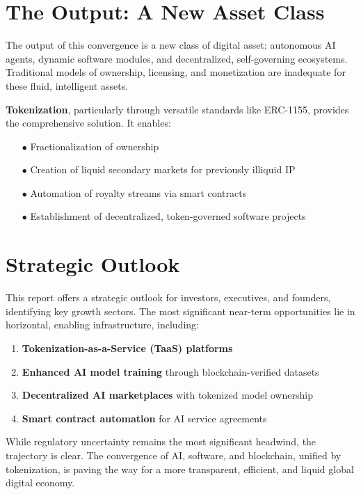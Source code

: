 \documentclass[11pt,a4paper]{report}
\newcommand{\techterm}[1]{\textbf{\textcolor{ocean}{#1}}}
\begin{document}
\section*{The Output: A New Asset Class}
The output of this convergence is a new class of digital asset: autonomous AI agents, dynamic software modules, and decentralized, self-governing ecosystems. Traditional models of ownership, licensing, and monetization are inadequate for these fluid, intelligent assets. 

\techterm{Tokenization}, particularly through versatile standards like ERC-1155, provides the comprehensive solution. It enables:

\begin{itemize}[leftmargin=2cm]
    \item[$\bullet$] Fractionalization of ownership
    \item[$\bullet$] Creation of liquid secondary markets for previously illiquid IP
    \item[$\bullet$] Automation of royalty streams via smart contracts
    \item[$\bullet$] Establishment of decentralized, token-governed software projects
\end{itemize}

\section*{Strategic Outlook}

This report offers a strategic outlook for investors, executives, and founders, identifying key growth sectors. The most significant near-term opportunities lie in horizontal, enabling infrastructure, including:

\begin{enumerate}
    \item \textbf{Tokenization-as-a-Service (TaaS) platforms}
    \item \textbf{Enhanced AI model training} through blockchain-verified datasets
    \item \textbf{Decentralized AI marketplaces} with tokenized model ownership
    \item \textbf{Smart contract automation} for AI service agreements
\end{enumerate}

While regulatory uncertainty remains the most significant headwind, the trajectory is clear. The convergence of AI, software, and blockchain, unified by tokenization, is paving the way for a more transparent, efficient, and liquid global digital economy.
\end{document}
